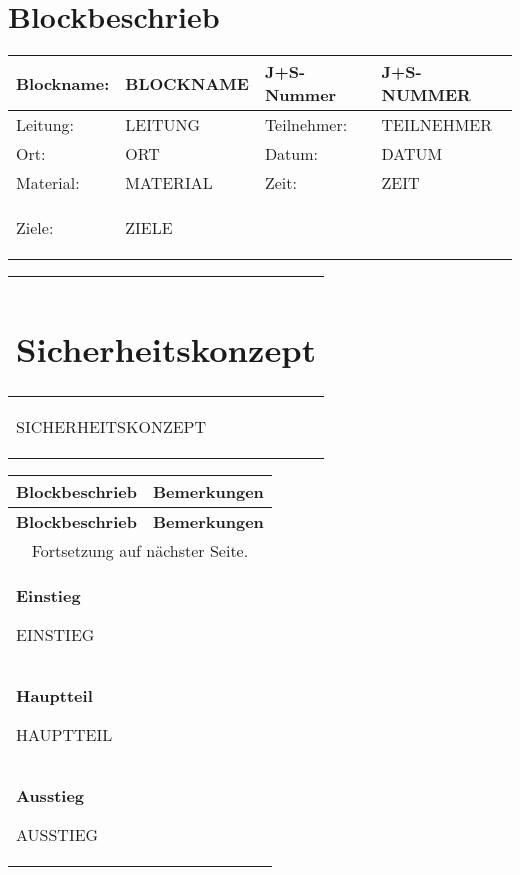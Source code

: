 \documentclass[12pt]{article}
\newcommand{\tstamp}{DATUM}
\begin{document}
\section*{Blockbeschrieb}
	\begin{tabular}{|p{2.5cm}|p{5.5cm}|p{2.5cm}|p{5.5cm}|}
	\hline
	Blockname: 	& BLOCKNAME	& J+S-Nummer	& J+S-NUMMER \\ \hline
	Leitung:		& LEITUNG		& Teilnehmer:	& TEILNEHMER \\ \hline
	Ort:			& ORT			& Datum:		& \tstamp \\ \hline
	Material:		& MATERIAL		& Zeit:		& ZEIT \\ \hline
	Ziele:		&  \multicolumn{3}{p{13.5cm+4\tabcolsep+2\arrayrulewidth}|}{\begin{compactitem} %
		\item ZIELE %
 	\end{compactitem}} \\
	\hline
\end{tabular}



\begin{tabular}{|p{17.5cm+3\arrayrulewidth}|}
	\hline
	\parbox[0pt][1.5cm][c]{0cm}{\section*{Sicherheitskonzept}}\\
	\hline
	\begin{compactitem}
		 \item SICHERHEITSKONZEPT
 	\end{compactitem}\\
 	\hline 
\end{tabular}

\begin{longtable}{|p{12cm}|p{5cm+2\arrayrulewidth}|}
	\hline 
	\bf Blockbeschrieb & \bf Bemerkungen \\ \hline 
	\endfirsthead \hline \bf Blockbeschrieb & \bf Bemerkungen \\ \hline 
	\endhead \hline 
	\multicolumn{2}{|c|}{Fortsetzung auf nächster Seite.} \\ \hline 
	\endfoot
	\endlastfoot 
	{\large\bf {Einstieg}}
	
	EINSTIEG & \\ \hline
	{\large\bf {Hauptteil}}
	
	HAUPTTEIL & \\ \hline
	{\large\bf {Ausstieg}}
	
	AUSSTIEG & \\ \hline

	\end{longtable}
\end{document}
